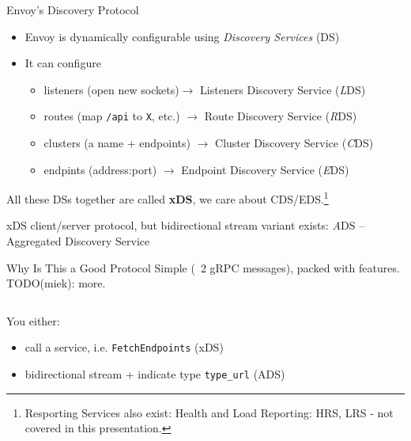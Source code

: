 \documentclass[aspectratio=169]{beamer}
\begin{document}
    \begin{frame}{Envoy's Discovery Protocol}
        \begin{itemize}
            \item Envoy is dynamically configurable using \emph{Discovery Services} (DS)
            \item It can configure
            \begin{itemize}
                \item listeners (open new sockets)$\rightarrow$ Listeners Discovery Service (\emph{L}DS)
                \item routes (map \texttt{/api} to \texttt{X}, etc.) $\rightarrow$ Route Discovery Service (\emph{R}DS)
                \item clusters (a name + endpoints) $\rightarrow$ Cluster Discovery Service (\emph{C}DS)
                \item endpints (address:port) $\rightarrow$ Endpoint Discovery Service (\emph{E}DS)
            \end{itemize}
        \end{itemize}

        All these DSs together are called {\bf xDS}, we care about CDS/EDS.\footnote{Resporting Services also exist: Health and Load
        Reporting: HRS, LRS - not covered in this presentation.}

        xDS client/server protocol, but bidirectional stream variant exists: \emph{A}DS -- Aggregated Discovery Service
    \end{frame}

    \begin{frame}{Why Is This a Good Protocol}
        Simple (~2 gRPC messages), packed with features. TODO(miek): more.
        \begin{columns}[T]
            \begin{column}{0.5\textwidth}
                
            \end{column}
            \begin{column}{0.5\textwidth}
                
            \end{column}
        \end{columns}

        You either:

        \begin{itemize}
            \item call a service, i.e. \texttt{FetchEndpoints} (xDS)
            \item bidirectional stream + indicate type \texttt{type_url} (ADS)
        \end{itemize}
    \end{frame}
\end{document}
